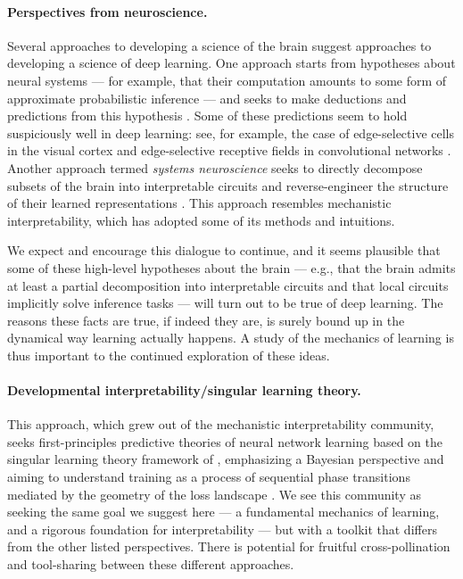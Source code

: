 \paragraph{Perspectives from neuroscience.}
Several approaches to developing a science of the brain suggest approaches to developing a science of deep learning.
One approach starts from hypotheses about neural systems --- for example, that their computation amounts to some form of approximate probabilistic inference --- and seeks to make deductions and predictions from this hypothesis \citep{dayan1995helmholtz,friston2010free}.
Some of these predictions seem to hold suspiciously well in deep learning: see, for example, the case of edge-selective cells in the visual cortex \citep{olshausen1996emergence} and edge-selective receptive fields in convolutional networks \citep[e.g.][]{zeiler2014visualizing}.
Another approach termed \textit{systems neuroscience} seeks to directly decompose subsets of the brain into interpretable circuits and reverse-engineer the structure of their learned representations \citep{chung2021neural,bernardi2020geometry,kriegeskorte2008representational}.
This approach resembles mechanistic interpretability, which has adopted some of its methods and intuitions.

We expect and encourage this dialogue to continue, and it seems plausible that some of these high-level hypotheses about the brain --- e.g., that the brain admits at least a partial decomposition into interpretable circuits and that local circuits implicitly solve inference tasks --- will turn out to be true of deep learning.
The reasons these facts are true, if indeed they are, is surely bound up in the dynamical way learning actually happens.
A study of the mechanics of learning is thus important to the continued exploration of these ideas.

\paragraph{Developmental interpretability/singular learning theory.}
This approach, which grew out of the mechanistic interpretability community, seeks first-principles predictive theories of neural network learning based on the singular learning theory framework of \citet{watanabe2009algebraic}, emphasizing a Bayesian perspective and aiming to understand training as a process of sequential phase transitions mediated by the geometry of the loss landscape \citep{hoogland2023developmental}.
We see this community as seeking the same goal we suggest here --- a fundamental mechanics of learning, and a rigorous foundation for interpretability --- but with a toolkit that differs from the other listed perspectives.
There is potential for fruitful cross-pollination and tool-sharing between these different approaches.

